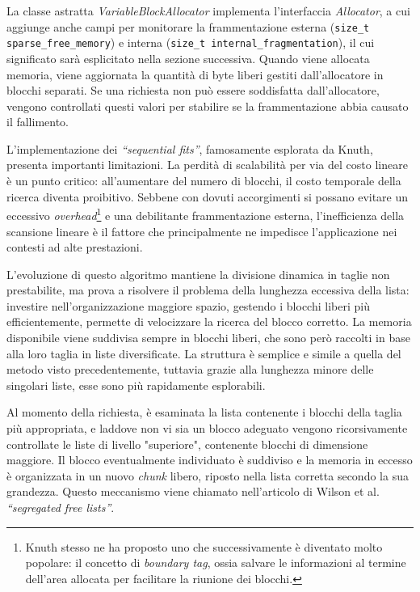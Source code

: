 La classe astratta \textit{VariableBlockAllocator} implementa l'interfaccia \textit{Allocator}, a cui aggiunge anche campi per monitorare la frammentazione esterna (\lstinline|size_t sparse_free_memory|) e interna (\lstinline[]|size_t internal_fragmentation|), il cui significato sarà esplicitato nella sezione successiva. Quando viene allocata memoria, viene aggiornata la quantità di byte liberi gestiti dall'allocatore in blocchi separati. Se una richiesta non può essere soddisfatta dall'allocatore, vengono controllati questi valori per stabilire se la frammentazione abbia causato il fallimento.

L'implementazione dei \textit{“sequential fits”}, famosamente esplorata da Knuth, presenta importanti limitazioni. La perdità di scalabilità per via del costo lineare è un punto critico: all’aumentare del numero di blocchi, il costo temporale della ricerca diventa proibitivo. Sebbene con dovuti accorgimenti si possano evitare un eccessivo \textit{overhead}\footnote{Knuth stesso ne ha proposto uno che successivamente è diventato molto popolare: il concetto di \textit{boundary tag}, ossia salvare le informazioni al termine dell'area allocata per facilitare la riunione dei blocchi.} e una debilitante frammentazione esterna, l’inefficienza della scansione lineare è il fattore che principalmente ne impedisce l'applicazione nei contesti ad alte prestazioni.

L’evoluzione di questo algoritmo mantiene la divisione dinamica in taglie non prestabilite, ma prova a risolvere il problema della lunghezza eccessiva della lista: investire nell’organizzazione maggiore spazio, gestendo i blocchi liberi più efficientemente, permette di velocizzare la ricerca del blocco corretto. La memoria disponibile viene suddivisa sempre in blocchi liberi, che sono però raccolti in base alla loro taglia in liste diversificate. La struttura è semplice e simile a quella del metodo visto precedentemente, tuttavia grazie alla lunghezza minore delle singolari liste, esse sono più rapidamente esplorabili.

Al momento della richiesta, è esaminata la lista contenente i blocchi della taglia più appropriata, e laddove non vi sia un blocco adeguato vengono ricorsivamente controllate le liste di livello "superiore", contenente blocchi di dimensione maggiore. Il blocco eventualmente individuato è suddiviso e la memoria in eccesso è organizzata in un nuovo \textit{chunk} libero, riposto nella lista corretta secondo la sua grandezza. Questo meccanismo viene chiamato nell’articolo di Wilson et al. \textit{“segregated free lists”}.


